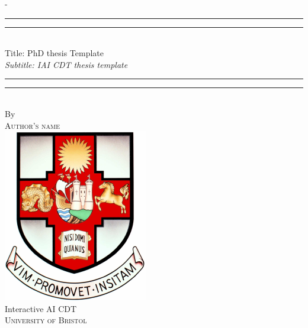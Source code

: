 %
%
% 
%
%
\begin{titlingpage}
\begin{SingleSpace}
\calccentering{\unitlength} 
\begin{adjustwidth*}{\unitlength}{-\unitlength}
\vspace*{13mm}
\begin{center}
\rule[0.5ex]{\linewidth}{2pt}\vspace*{-\baselineskip}\vspace*{3.2pt}
\rule[0.5ex]{\linewidth}{1pt}\\[\baselineskip]
{\HUGE  Title: PhD thesis Template }\\[4mm]
{\Large \textit{Subtitle: IAI CDT thesis template}}\\
\rule[0.5ex]{\linewidth}{1pt}\vspace*{-\baselineskip}\vspace{3.2pt}
\rule[0.5ex]{\linewidth}{2pt}\\
\vspace{6.5mm}
{\large By}\\
\vspace{6.5mm}
{\large\textsc{Author's name}}\\
\vspace{10mm}
\includegraphics[scale=0.6]{logos/bristolcrest_colour}
\\
\vspace{10mm}
{\large Interactive AI CDT\\
\textsc{University of Bristol}}
\\



\end{center}
\end{adjustwidth*}
\end{SingleSpace}
\end{titlingpage}
